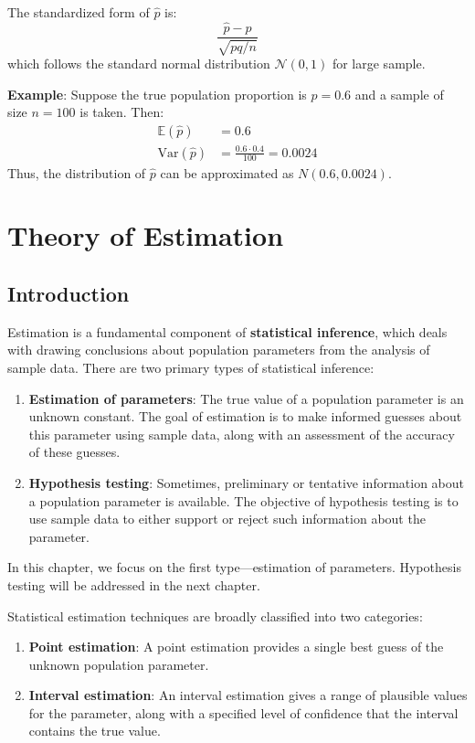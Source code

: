 \documentclass[twoside]{book}
\begin{document}
The standardized form of \( \hat{p} \) is:
\[
\frac{\hat{p} - p}{\sqrt{pq/n}}
\]
which follows the standard normal distribution $\mathcal{N}\left(0, 1\right)$ for large sample.

\textbf{Example}: Suppose the true population proportion is \( p = 0.6 \) and a sample of size \( n = 100 \) is taken. Then:
\begin{align*}
\mathbb{E}\left( \hat{p}\right) &= 0.6 \\
\textrm{Var}(\hat{p}) &= \frac{0.6 \cdot 0.4}{100} = 0.0024
\end{align*}
Thus, the distribution of \( \hat{p} \) can be approximated as \( N(0.6, 0.0024) \).


\chapter{Theory of Estimation}

\section{Introduction}
Estimation is a fundamental component of \textbf{statistical inference}, which deals with drawing conclusions about population parameters from the analysis of sample data. There are two primary types of statistical inference:

\begin{enumerate}
    \item \textbf{Estimation of parameters}: The true value of a population parameter is an unknown constant. The goal of estimation is to make informed guesses about this parameter using sample data, along with an assessment of the accuracy of these guesses.
    
    \item \textbf{Hypothesis testing}: Sometimes, preliminary or tentative information about a population parameter is available. The objective of hypothesis testing is to use sample data to either support or reject such information about the parameter.
\end{enumerate}

In this chapter, we focus on the first type—{estimation of parameters}. Hypothesis testing will be addressed in the next chapter.

Statistical estimation techniques are broadly classified into two categories:

\begin{enumerate}
    \item \textbf{Point estimation}: A point estimation provides a single best guess of the unknown population parameter.
    
    \item \textbf{Interval estimation}: An interval estimation gives a range of plausible values for the parameter, along with a specified level of confidence that the interval contains the true value.
\end{enumerate}
\end{document}
